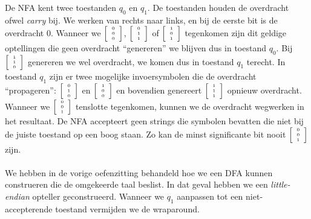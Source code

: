 \documentclass[a4paper]{article}
\newcommand{\kolom}[1]{ \left[ \begin{array}{c} #1 \end{array} \right] }
\begin{document}
\begin{question}
\begin{answer}
De NFA kent twee toestanden $q_0$ en $q_1$. De toestanden houden de overdracht ofwel \emph{carry} bij. We werken van rechts naar links, en bij de eerste bit is de overdracht $0$. Wanneer we $\tiny{\kolom{0\\0\\0}}$, $\tiny{\kolom{0\\1\\1}}$ of $\tiny{\kolom{1\\0\\1}}$ tegenkomen zijn dit geldige optellingen die geen overdracht ``genereren'' we blijven dus in toestand $q_0$. Bij $\tiny{\kolom{1\\1\\0}}$ genereren we wel overdracht, we komen dus in toestand $q_1$ terecht. In toestand $q_1$ zijn er twee mogelijke invoersymbolen die de overdracht ``propageren'': $\tiny{\kolom{0\\1\\0}}$ en $\tiny{\kolom{1\\0\\0}}$ en bovendien genereert $\tiny{\kolom{1\\1\\1}}$ opnieuw overdracht. Wanneer we $\tiny{\kolom{0\\0\\1}}$ tenslotte tegenkomen, kunnen we de overdracht wegwerken in het resultaat. De NFA accepteert geen strings die symbolen bevatten die niet bij de juiste toestand op een boog staan. Zo kan de minst significante bit nooit $\tiny{\kolom{0\\0\\1}}$ zijn.
\paragraph{}
We hebben in de vorige oefenzitting behandeld hoe we een DFA kunnen construeren die de omgekeerde taal beslist. In dat geval hebben we een \emph{little-endian} opteller geconstrueerd. Wanneer we $q_1$ aanpassen tot een niet-accepterende toestand vermijden we de wraparound.
\end{answer}
\end{question}
\end{document}
